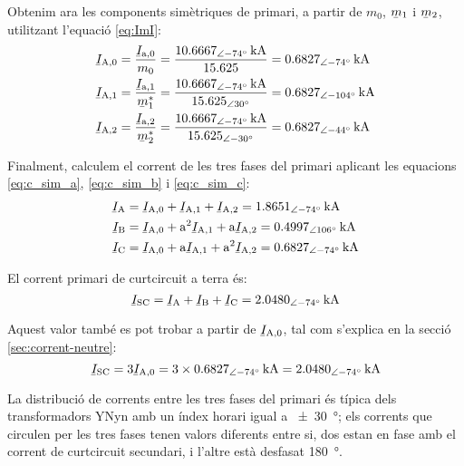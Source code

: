 \begin{exemple}[\CCasimSecTrafo{}]
    Obtenim ara les components simètriques de primari, a partir de $m_0$, $\cmplx{m}_1$ i $\cmplx{m}_2$, utilitzant l'equació \eqref{eq:ImI}:
    \begin{align*}
        \cmplx{I}\ped{A,0} &= \frac{\cmplx{I}\ped{a,0}}{m_0} = \frac{\qtypd{10,6667}{-74}{kA}}{\num{15,625}} =  \qtypd{0,6827}{-74}{kA}\\
        \cmplx{I}\ped{A,1} &= \frac{\cmplx{I}\ped{a,1}}{\cmplx{m}^*_1} = \frac{\qtypd{10,6667}{-74}{kA}}{\numpd{15,625}{30}} =  \qtypd{0,6827}{-104}{kA} \\
        \cmplx{I}\ped{A,2} &= \frac{\cmplx{I}\ped{a,2}}{\cmplx{m}^*_2} = \frac{\qtypd{10,6667}{-74}{kA}}{\numpd{15,625}{-30}} = \qtypd{0,6827}{-44}{kA}
    \end{align*}

    Finalment, calculem el corrent de les tres fases del primari aplicant les equacions \eqref{eq:c_sim_a}, \eqref{eq:c_sim_b} i \eqref{eq:c_sim_c}:
     \begin{align*}
        \cmplx{I}\ped{A} &= \cmplx{I}\ped{A,0} + \cmplx{I}\ped{A,1} + \cmplx{I}\ped{A,2} = \qtypd{1,8651}{-74}{kA} \\
        \cmplx{I}\ped{B} &= \cmplx{I}\ped{A,0} + \au^2 \cmplx{I}\ped{A,1} + \au \cmplx{I}\ped{A,2} = \qtypd{0,4997}{106}{kA} \\
        \cmplx{I}\ped{C} &= \cmplx{I}\ped{A,0} + \au \cmplx{I}\ped{A,1} + \au^2 \cmplx{I}\ped{A,2} = \qtypd{0,6827}{-74}{kA}
    \end{align*}

    El corrent primari de curtcircuit a terra és:
    \[
        \cmplx{I}\ped{SC} = \cmplx{I}\ped{A} + \cmplx{I}\ped{B} + \cmplx{I}\ped{C} = \qtypd{2,0480}{-74}{kA}
    \]

    Aquest valor també es pot trobar a partir de $\cmplx{I}\ped{A,0}$, tal com s'explica en la secció \vref{sec:corrent-neutre}:
       \[
        \cmplx{I}\ped{SC} = 3 \cmplx{I}\ped{A,0} = 3 \times \qtypd{0,6827}{-74}{kA} = \qtypd{2,0480}{-74}{kA}
    \]

    La distribució de corrents entre les tres fases del primari és típica dels transformadors YNyn amb un índex horari igual a \qty{+-30}{\degree}; els corrents que circulen per les tres fases tenen valors diferents entre si, dos estan en fase amb el corrent de curtcircuit secundari, i l'altre està desfasat \qty{180}{\degree}.


\end{exemple}
